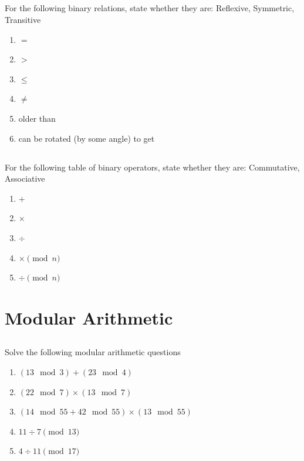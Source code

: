 \documentclass[twocolumn]{article}
\newcommand\mrk[1]{}
\begin{document}
\subsection{}

    For the following binary relations, state whether they are: Reflexive, Symmetric, Transitive

    \begin{enumerate}
        \item $=$ \mrk{1}
        \item $ > $ \mrk{1}
        \item $ \leq $ \mrk{1}
        \item $ \ne $ \mrk{1}
        \item older than \mrk{1}
        \item can be rotated (by some angle) to get \mrk{1}
    \end{enumerate}

\subsection{}

    For the following table of binary operators, state whether they are: Commutative, Associative

    \begin{enumerate}
        \item $ + $ \mrk{1}
        \item $ \times $ \mrk{1}
        \item $ \div $ \mrk{1}
        \item $ \times \pmod{n} $ \mrk{1}
        \item $ \div \pmod{n} $ \mrk{1}
    \end{enumerate}   


\clearpage
\section{Modular Arithmetic}

\subsection{}

    Solve the following modular arithmetic questions

    \begin{enumerate}
        \item $(13 \mod 3) + (23 \mod 4)$  \mrk{1}
        \item $(22 \mod 7) \times (13 \mod 7)$  \mrk{1}
        \item $(14 \mod 55 + 42 \mod 55) \times (13 \mod 55)$  \mrk{1}
        \item $11 \div 7 \pmod{13}$  \mrk{1}
        \item $4 \div 11 \pmod{17}$  \mrk{1}
    \end{enumerate}
\end{document}
